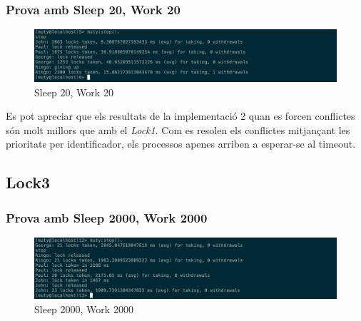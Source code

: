 \documentclass[a4paper, 11pt]{article}
\begin{document}
\subsubsection{Prova amb Sleep 20, Work 20}

\begin{figure}[H]
    \centering
    \includegraphics[width=1.0\textwidth]{figures/20-20lock2}
    \caption{Sleep 20, Work 20 \label{fig:20-20lock2}}    
\end{figure}

Es pot apreciar que els resultats de la implementació 2 quan es forcen conflictes són molt millors que amb el \textit{Lock1}. Com es resolen els conflictes mitjançant les prioritats per identificador, els processos apenes arriben a esperar-se al timeout. 

\subsection{Lock3}

\subsubsection{Prova amb Sleep 2000, Work 2000}

\begin{figure}[H]
    \centering
    \includegraphics[width=1.0\textwidth]{figures/2000-2000lock3}
    \caption{Sleep 2000, Work 2000 \label{fig:2000-2000lock3}}    
\end{figure}
\end{document}
